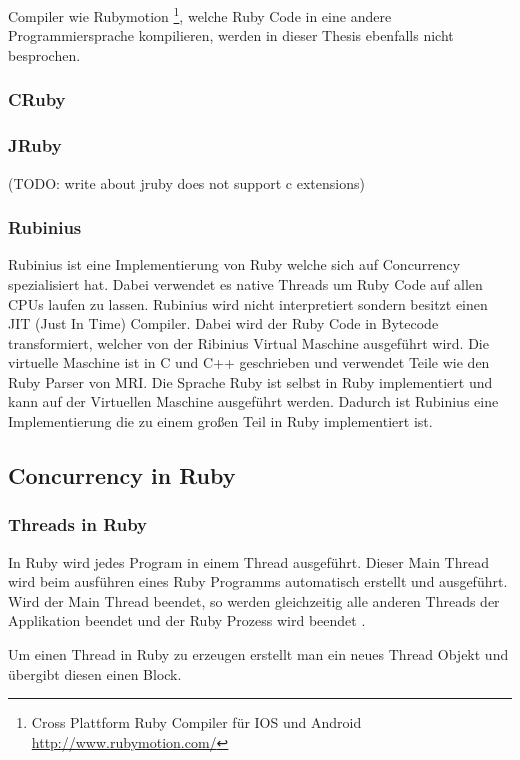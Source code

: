 Compiler wie Rubymotion \footnote{Cross Plattform Ruby Compiler für IOS und Android \url{http://www.rubymotion.com/}}, welche Ruby Code in eine andere Programmiersprache kompilieren, werden in dieser Thesis ebenfalls nicht besprochen.

\subsubsection{CRuby}


\subsubsection{JRuby}

(TODO: write about jruby does not support c extensions)


\subsubsection{Rubinius}
Rubinius ist eine Implementierung von Ruby welche sich auf Concurrency spezialisiert hat. Dabei verwendet es native Threads um Ruby Code auf allen CPUs laufen zu lassen. Rubinius wird nicht interpretiert sondern besitzt einen JIT (Just In Time) Compiler. Dabei wird der Ruby Code in Bytecode transformiert, welcher von der Ribinius Virtual Maschine ausgeführt wird. Die virtuelle Maschine ist in C und C++ geschrieben und verwendet Teile wie den Ruby Parser von MRI. Die Sprache Ruby ist selbst in Ruby implementiert und kann auf der Virtuellen Maschine ausgeführt werden. Dadurch ist Rubinius eine Implementierung die zu einem großen Teil in Ruby implementiert ist. 



\subsection{Concurrency in Ruby}

\subsubsection{Threads in Ruby}
In Ruby wird jedes Program in einem Thread ausgeführt. Dieser Main Thread wird beim ausführen eines Ruby Programms automatisch erstellt und ausgeführt. Wird der Main Thread beendet, so werden gleichzeitig alle anderen Threads der Applikation beendet und der Ruby Prozess wird beendet \cite[p. 15]{Sto2013}.

Um einen Thread in Ruby zu erzeugen erstellt man ein neues Thread Objekt und übergibt diesen einen Block. 

